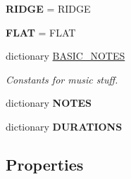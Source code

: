 \begin{DoxyCompactItemize}
{\bfseries R\+I\+D\+GE} = R\+I\+D\+GE
\item 
\mbox{\label{classappjar_1_1gui_aadfc1fce7313d20ea43db48919c1ccbb}} 
{\bfseries F\+L\+AT} = F\+L\+AT
\item 
dictionary \hyperlink{classappjar_1_1gui_a97f9c9e837b04c0601f2a158913aaa9c}{B\+A\+S\+I\+C\+\_\+\+N\+O\+T\+ES}
\begin{DoxyCompactList}\small\item\em Constants for music stuff. \end{DoxyCompactList}\item 
dictionary {\bfseries N\+O\+T\+ES}
\item 
dictionary {\bfseries D\+U\+R\+A\+T\+I\+O\+NS}
\end{DoxyCompactItemize}
\subsection*{Properties}
